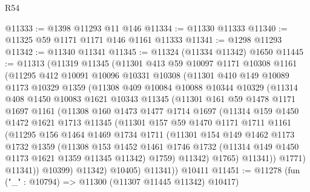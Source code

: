 \begin{lexlean}{R54}
\begin{coremodule}
@11333 := @1398 @11293 @11 @146
@11334 := @11330 @11333
@11340 := @11325 @59 @1171 @1171 @146 @1161 @11333
@11341 := @1298 @11293
@11342 := @11340 @11341
@11345 := @11324 (@11334 @11342) @1650
@11445 := @11313
    (@11319
      @11345
      (@11301
        @413
        @59
        @10097
        @1171
        @10308
        @1161
        (@11295
          @412
          @10091
          @10096
          @10331
          @10308
          (@11301
            @410
            @149
            @10089
            @1173
            @10329
            @1359
            (@11308
              @409
              @10084
              @10088
              @10344
              @10329
              (@11314
                @408
                @1450
                @10083
                @1621
                @10343
                @11345
                (@11301
                  @161
                  @59
                  @1478
                  @1171
                  @1697
                  @1161
                  (@11308
                    @160
                    @1473
                    @1477
                    @1714
                    @1697
                    (@11314
                      @159
                      @1450
                      @1472
                      @1621
                      @1713
                      @11345
                      (@11301
                        @157
                        @59
                        @1470
                        @1171
                        @1711
                        @1161
                        (@11295
                          @156
                          @1464
                          @1469
                          @1734
                          @1711
                          (@11301
                            @154
                            @149
                            @1462
                            @1173
                            @1732
                            @1359
                            (@11308
                              @153
                              @1452
                              @1461
                              @1746
                              @1732
                              (@11314 @149 @1450 @1173 @1621 @1359 @11345 @11342)
                              @1759)
                            @11342)
                          @1765)
                        @11341))
                    @1771)
                  @11341))
              @10399)
            @11342)
          @10405)
        @11341))
    @10411
@11451 := @11278 (fun ("_" : @10794) => @11300 (@11307 @11445 @11342) @10417)

\end{coremodule}
\end{lexlean}
